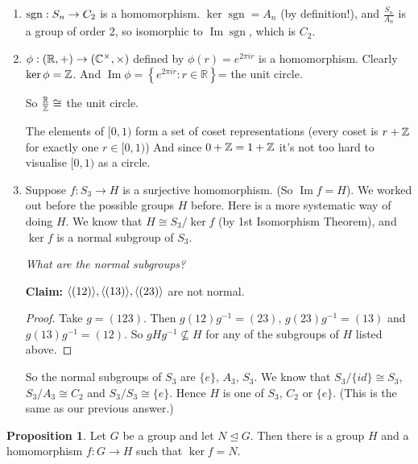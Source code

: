 \documentclass{article}
\theoremstyle{definition} \newtheorem*{definition}{Definition}
\newtheorem{proposition}[theorem]{Proposition}
\newcommand{\reals}{\mathbb{R}} \newcommand{\rationals}{\mathbb{Q}}
\newcommand{\ism}{\cong} \newcommand{\elemt}[2]{#1_{{#2}\sigma(#2)}}
\DeclareMathOperator{\sgn}{sgn} \DeclareMathOperator{\id}{id}
\DeclareMathOperator{\Ima}{Im} \DeclareMathOperator{\Sym}{Sym}
\begin{document}
\begin{exmps}\hfill \begin{enumerate} \item $\func{\sgn}{S_n}{C_2}$ is a
        homomorphism.  $\ker \sgn = A_n$ (by definition!), and
      $\frac{S_n}{A_n}$ is a group of order 2, so isomorphic to $\Ima \sgn$,
    which is $C_2$.  \item
      $\func{\phi}{(\reals,+)}{(\complexes^\times,\times)}$ defined by
      $\phi(r)=e^{2\pi i r}$ is a homomorphism.  Clearly $\ker \phi =
      \mathbb{Z}$.  And $\Ima \phi = \left\{ e^{2\pi i r} : r \in \reals
    \right\}$= the unit circle.

      So $\frac{\reals}{\integers}\ism$ the unit circle.


      The elements of $[0,1)$ form a set of coset representations (every coset
        is $r+\mathbb{Z}$ for exactly one $r \in [0,1)$) And since $0+\mathbb{Z}
          = 1+\mathbb{Z}$ it's not too hard to visualise $[0,1)$ as a circle.

      \item Suppose $f:S_3 \rightarrow H$ is a surjective homomorphism. (So
        $\Ima f = H$). We worked out before the possible groups $H$ before.
        Here is a more systematic way of doing $H$. We know that $H \ism
        S_3/\ker f$ (by 1st Isomorphism Theorem), and $\ker f$ is a normal
        subgroup of $S_3$.

        \emph{What are the normal subgroups?}

        \textbf{Claim:} $\langle (12) \rangle,\langle (13) \rangle, \langle (23) \rangle$ are not normal.

        \begin{proof} Take $g=(123)$. Then $g(12)g^{-1}=(23)$,
          $g(23)g^{-1}=(13)$ and $g(13)g^{-1}=(12)$. So $gHg^{-1} \not\subseteq
          H$ for any of the subgroups of $H$ listed above.  \end{proof} So the
        normal subgroups of $S_3$ are $\{e\}$, $A_3$, $S_3$. We know that
        $S_3/\{id\} \ism S_3$, $S_3/A_3 \ism C_2$ and $S_3/S_3 \ism \{e\}$.
        Hence $H$ is one of $S_3$, $C_2$ or $\{e\}$. (This is the same as our
        previous answer.)\\ \end{enumerate} \end{exmps}

  \begin{proposition} Let $G$ be a group and let $N \trianglelefteq G$. Then
    there is a group $H$ and a homomorphism $f : G \rightarrow H$ such that
    $\ker f = N$.  \end{proposition}
\end{document}
